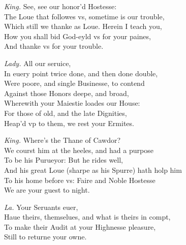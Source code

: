 \documentclass[12pt]{sides}
\newcommand{\dia}[1]{\hskip 15pt\textit{#1}\hskip 6pt}
\begin{document}
\begin{multicols}{2}
            \dia{King.} See, see our honor'd Hostesse: \\ The Loue that followes vs, sometime is our trouble, \\ Which still we thanke as Loue. Herein I teach you, \\ How you shall bid God-eyld vs for your paines, \\ And thanke vs for your trouble.

            \dia{Lady.} All our seruice, \\ In euery point twice done, and then done double, \\ Were poore, and single Businesse, to contend \\ Against those Honors deepe, and broad, \\ Wherewith your Maiestie loades our House: \\ For those of old, and the late Dignities, \\ Heap'd vp to them, we rest your Ermites.

            \dia{King.} Where's the Thane of Cawdor? \\ We courst him at the heeles, and had a purpose \\ To be his Purueyor: But he rides well, \\ And his great Loue (sharpe as his Spurre) hath holp him \\ To his home before vs: Faire and Noble Hostesse \\ We are your guest to night.

            \dia{La.} Your Seruants euer, \\ Haue theirs, themselues, and what is theirs in compt, \\ To make their Audit at your Highnesse pleasure, \\ Still to returne your owne.


\end{multicols}
\end{document}
